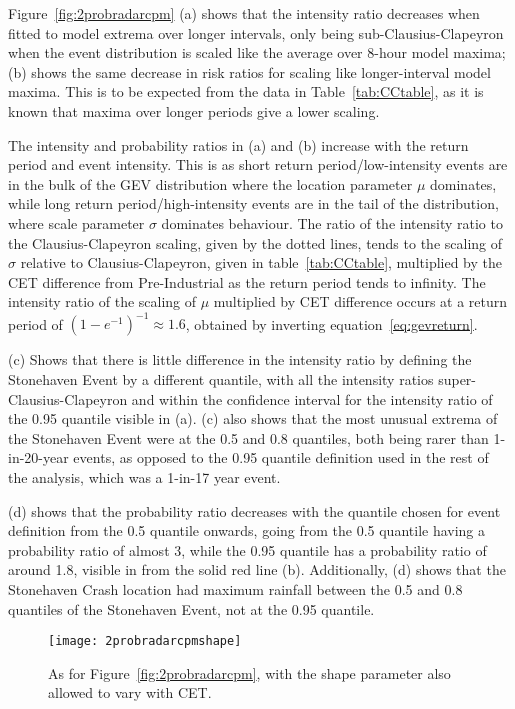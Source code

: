 Figure~\ref{fig:2probradarcpm} (a) shows that the intensity ratio decreases when fitted to model extrema over longer intervals,
    only being sub-Clausius-Clapeyron when the event distribution is scaled like the average over 8-hour model maxima;
(b) shows the same decrease in risk ratios for scaling like longer-interval model maxima.
This is to be expected from the data in Table~\ref{tab:CCtable},
    as it is known that maxima over longer periods give a lower scaling.

The intensity and probability ratios in (a) and (b) increase with the return period and event intensity.
This is as short return period/low-intensity events are in the bulk of the GEV distribution
    where the location parameter $\mu$ dominates, while long return period/high-intensity events are in the tail of
    the distribution, where scale parameter $\sigma$ dominates behaviour.
The ratio of the intensity ratio to the Clausius-Clapeyron scaling, given by the dotted lines,
    tends to the scaling of $\sigma$ relative to Clausius-Clapeyron,
    given in table~\ref{tab:CCtable}, multiplied by the CET difference from Pre-Industrial as the return period tends to infinity.
The intensity ratio of the scaling of $\mu$ multiplied by CET difference occurs at a return period of
    $\left( 1- e^{-1} \right)^{-1} \approx 1.6$, obtained by inverting equation~\ref{eq:gevreturn}.

(c) Shows that there is little difference in the intensity ratio by defining the Stonehaven Event by a different
    quantile, with all the intensity ratios super-Clausius-Clapeyron and within the confidence interval
    for the intensity ratio of the 0.95 quantile visible in (a).
(c) also shows that the most unusual extrema of the Stonehaven Event were at the 0.5 and 0.8 quantiles,
    both being rarer than 1-in-20-year events, as opposed to the 0.95 quantile definition used in the
    rest of the analysis, which was a 1-in-17 year event.

(d) shows that the probability ratio decreases with the quantile chosen for event definition from the 0.5 quantile onwards,
    going from the 0.5 quantile having a probability ratio of almost 3,
    while the 0.95 quantile has a probability ratio of around 1.8, visible in from the solid red line (b).
Additionally, (d) shows that the Stonehaven Crash location had maximum rainfall between the 0.5 and 0.8 quantiles of the Stonehaven Event,
    not at the 0.95 quantile.

\begin{figure}[H]
    \centering
    \texttt{[image: 2probradarcpmshape]}
    \caption[Figure~\ref{fig:2probradarcpm} with a covariate fit shape.]{
        As for Figure~\ref{fig:2probradarcpm},
    with the shape parameter also allowed to vary with CET.}
    \label{fig:2probradarcpmshape}
\end{figure}

